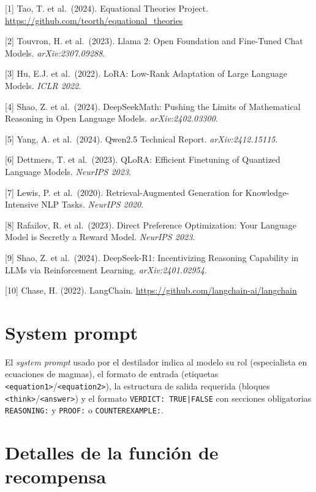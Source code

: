 \documentclass{article}
\begin{document}
{\small

[1] Tao, T. et al.\ (2024). Equational Theories Project. \url{https://github.com/teorth/equational_theories}

[2] Touvron, H. et al.\ (2023). Llama 2: Open Foundation and Fine-Tuned Chat Models. \textit{arXiv:2307.09288}.

[3] Hu, E.J. et al.\ (2022). LoRA: Low-Rank Adaptation of Large Language Models. \textit{ICLR 2022}.

[4] Shao, Z. et al.\ (2024). DeepSeekMath: Pushing the Limits of Mathematical Reasoning in Open Language Models. \textit{arXiv:2402.03300}.

[5] Yang, A. et al.\ (2024). Qwen2.5 Technical Report. \textit{arXiv:2412.15115}.

[6] Dettmers, T. et al.\ (2023). QLoRA: Efficient Finetuning of Quantized Language Models. \textit{NeurIPS 2023}.

[7] Lewis, P. et al.\ (2020). Retrieval-Augmented Generation for Knowledge-Intensive NLP Tasks. \textit{NeurIPS 2020}.

[8] Rafailov, R. et al.\ (2023). Direct Preference Optimization: Your Language Model is Secretly a Reward Model. \textit{NeurIPS 2023}.

[9] Shao, Z. et al.\ (2024). DeepSeek-R1: Incentivizing Reasoning Capability in LLMs via Reinforcement Learning. \textit{arXiv:2401.02954}.

[10] Chase, H. (2022). LangChain. \url{https://github.com/langchain-ai/langchain}

}


\appendix

\section{System prompt}
\label{app:prompt}

El \textit{system prompt} usado por el destilador indica al modelo su rol (especialista en ecuaciones de magmas), el formato de entrada (etiquetas \texttt{<equation1>}/\texttt{<equation2>}), la estructura de salida requerida (bloques \texttt{<think>}/\texttt{<answer>}) y el formato \texttt{VERDICT:~TRUE|FALSE} con secciones obligatorias \texttt{REASONING:} y \texttt{PROOF:} o \texttt{COUNTEREXAMPLE:}.

\section{Detalles de la funci\'on de recompensa}
\label{app:reward}
\end{document}
